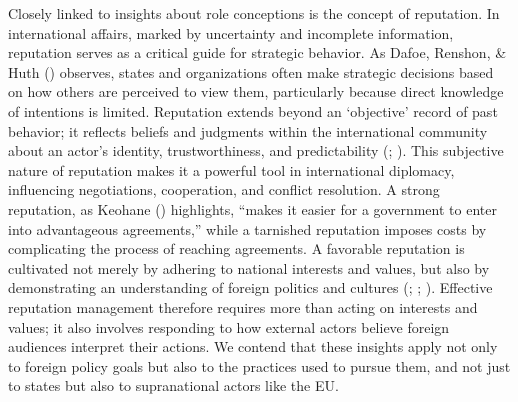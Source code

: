 \documentclass[
  letterpaper,
  DIV=11,
  numbers=noendperiod]{scrartcl}
\begin{document}
Closely linked to insights about role conceptions is the concept of
reputation. In international affairs, marked by uncertainty and
incomplete information, reputation serves as a critical guide for
strategic behavior. As Dafoe, Renshon, \& Huth
() observes, states and
organizations often make strategic decisions based on how others are
perceived to view them, particularly because direct knowledge of
intentions is limited. Reputation extends beyond an `objective' record
of past behavior; it reflects beliefs and judgments within the
international community about an actor's identity, trustworthiness, and
predictability (;
). This subjective nature of
reputation makes it a powerful tool in international diplomacy,
influencing negotiations, cooperation, and conflict resolution. A strong
reputation, as Keohane () highlights, ``makes it easier for a government to enter into
advantageous agreements,'' while a tarnished reputation imposes costs by
complicating the process of reaching agreements. A favorable reputation
is cultivated not merely by adhering to national interests and values,
but also by demonstrating an understanding of foreign politics and
cultures (;
;
). Effective reputation
management therefore requires more than acting on interests and values;
it also involves responding to how external actors believe foreign
audiences interpret their actions. We contend that these insights apply
not only to foreign policy goals but also to the practices used to
pursue them, and not just to states but also to supranational actors
like the EU.
\end{document}
